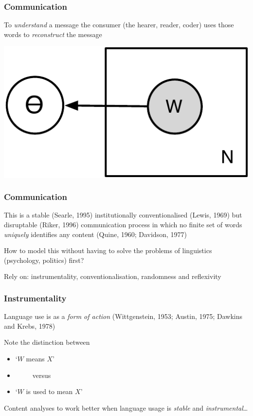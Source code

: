 \documentclass[11pt,compress,professionalfonts]{beamer}
\newcommand{\ita}{\begin{itemize}}
\newcommand{\itm}{\item[]}
\newcommand{\itz}{\end{itemize}}
\begin{document}
\begin{frame}[t]\frametitle{Communication}

To \textsl{understand} a message the consumer (the hearer, reader, coder) uses those words to \textsl{reconstruct} the message

\begin{center}
\includegraphics[scale=.9]{pictures/inf-plate}
\end{center}



\end{frame}
\begin{frame}[t]\frametitle{Communication}

This is a stable (Searle, 1995) institutionally conventionalised (Lewis, 1969) but disruptable (Riker, 1996) communication process
in which no finite set of words \textsl{uniquely} identifies any content (Quine, 1960; Davidson, 1977)

How to model this without having to solve the problems of linguistics (psychology, politics) first?

Rely on: instrumentality, conventionalisation, randomness and reflexivity

\end{frame}
\begin{frame}[t]\frametitle{Instrumentality}

Language use is as a \textit{form of action} (Wittgenstein, 1953; Austin, 1975; Dawkins and Krebs, 1978)

Note the distinction between
\ita
\itm `$W$ {means} $X$'
\itm ~~~~~versus
\itm `$W$ {is used to mean} $X$'
\itz

Content analyses to work better when language usage is \textit{stable} and \textit{instrumental}\ldots



\end{frame}
\end{document}

